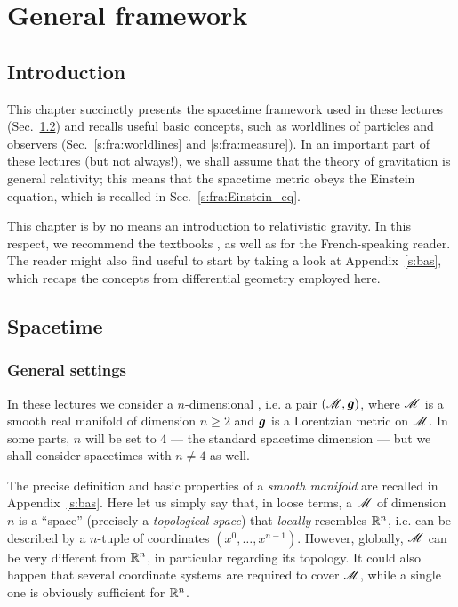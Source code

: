 \chapter{General framework} \label{s:fra}

\minitoc

\section{Introduction}

This chapter succinctly presents the spacetime framework used in these lectures
(Sec.~\ref{s:fra:spacetime})
and recalls useful basic concepts, such as worldlines of particles and observers
(Sec.~\ref{s:fra:worldlines} and \ref{s:fra:measure}).
In an important part of these lectures (but not always!),
we shall assume that the theory of gravitation is general
relativity; this means that the spacetime metric obeys the Einstein equation,
which is recalled in Sec.~\ref{s:fra:Einstein_eq}.

This chapter is by no means an introduction to relativistic gravity. In this respect, we
recommend the textbooks \cite{Carro04,Choqu15,DerueU18,Hartl03,MisneTW73,Strau13,Wald84}, as well as \cite{DerueU14,Gourg14,Langl13} for the French-speaking reader.
The reader might also find useful to start by taking a look at Appendix~\ref{s:bas}, which
recaps the concepts from differential geometry employed here.

\section{Spacetime} \label{s:fra:spacetime}

\subsection{General settings} \label{s:fra:general_settings}

In these lectures we consider a $n$-dimensional ,
i.e. a pair $(\mathscr{M}, \bm{g})$, where $\mathscr{M}$ is a smooth real manifold of dimension $n\geq 2$
and $\bm{g}$ is a Lorentzian metric on $\mathscr{M}$. In some parts, $n$ will be set to 4
--- the standard spacetime dimension --- but we shall consider spacetimes with
$n\neq 4$ as well.

The precise definition and basic properties of a \emph{smooth manifold} are recalled
in Appendix~\ref{s:bas}. Here let us simply say that, in loose terms,
a  $\mathscr{M}$ of dimension $n$ is a ``space'' (precisely a
\emph{topological space}) that \emph{locally} resembles $\mathbb{R}^n$,
i.e. can be described by a $n$-tuple of coordinates $(x^0,\ldots,x^{n-1})$. However, globally,
$\mathscr{M}$ can be very different from $\mathbb{R}^n$, in particular regarding its topology. It could also happen
that several coordinate systems are required to cover $\mathscr{M}$, while a single one is obviously
sufficient for $\mathbb{R}^n$.

